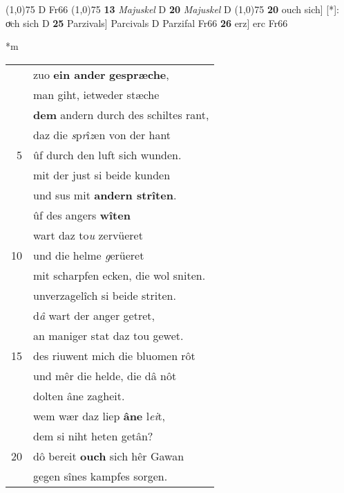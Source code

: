 \documentclass[8pt,a4paper,notitlepage]{article}
\begin{document}
\begin{table}[ht]
\begin{minipage}[t]{0.5\linewidth}
\begin{tabular}{rl}
\end{tabular}
\scriptsize
\line(1,0){75} \newline
D Fr66 \newline
\line(1,0){75} \newline
\textbf{13} \textit{Majuskel} D  \textbf{20} \textit{Majuskel} D  \newline
\line(1,0){75} \newline
\textbf{20} ouch sich] [*]: oͮch sich D \textbf{25} Parzivals] Parcivals D Parzifal Fr66 \textbf{26} erz] erc Fr66 \newline
\end{minipage}
\hspace{0.5cm}
\begin{minipage}[t]{0.5\linewidth}
\small
\begin{center}*m
\end{center}
\begin{tabular}{rl}
 & zuo \textbf{ein ander} \textbf{gespræche},\\ 
 & man giht, ietweder stæche\\ 
 & \textbf{dem} andern durch des schiltes rant,\\ 
 & daz die \textit{s}p\textit{r}î\textit{z}en von der hant\\ 
5 & ûf durch den luft sich wunden.\\ 
 & mit der just si beide kunden\\ 
 & und sus mit \textbf{andern strîten}.\\ 
 & ûf des angers \textbf{wîten}\\ 
 & wart daz to\textit{u} zervüeret\\ 
10 & und die helme \textit{g}erüeret\\ 
 & mit scharpfen ecken, die wol sniten.\\ 
 & unverzagelîch si beide striten.\\ 
 & d\textit{â} wart der anger getret,\\ 
 & an maniger stat daz tou gewet.\\ 
15 & des riuwent mich die bluomen rôt\\ 
 & und mêr die helde, die dâ nôt\\ 
 & dolten âne zagheit.\\ 
 & wem wær daz liep \textbf{âne} l\textit{ei}t,\\ 
 & dem si niht heten getân?\\ 
20 & dô bereit \textbf{ouch} sich hêr Gawan\\ 
 & gegen sînes kampfes sorgen.\\ 

\end{tabular}
\end{minipage}
\end{table}
\end{document}
